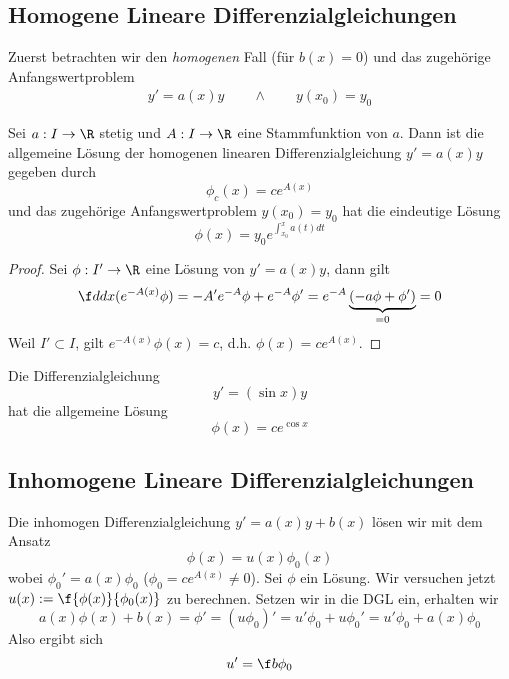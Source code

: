\documentclass{mycourse}
\begin{document}
\subsection{Homogene Lineare Differenzialgleichungen}

Zuerst betrachten wir den \emph{homogenen} Fall (für $b(x) = 0$) und das zugehörige Anfangswertproblem
\begin{align*}
	y' = a(x)y \qquad\land\qquad
y(x_0) = y_0
\end{align*}

\begin{st} \label{11.2}
	Sei $a:I \to \R$ stetig und $A:I\to \R$ eine Stammfunktion von $a$.
	Dann ist die allgemeine Lösung der homogenen linearen Differenzialgleichung $y' = a(x) y$ gegeben durch
	\[
		\phi_c (x) = c e^{A(x)}
	\]
	und das zugehörige Anfangswertproblem $y(x_0) = y_0$ hat die eindeutige Lösung
	\[
		\phi(x) = y_0 e^{\int_{x_0}^xa(t)dt}
	\]
	\begin{proof}
		Sei $\phi: I' \to \R$ eine Lösung von $y' = a(x) y$, dann gilt
		\[
			\f d{dx} (e^{-A(x)}\phi) = -A'e^{-A}\phi + e^{-A}\phi' = e^{-A}\underbrace{(-a\phi + \phi')}_{=0} = 0
		\]
		Weil $I'\subset I$, gilt $e^{-A(x)}\phi(x) = c$, d.h. $\phi(x) = c e^{A(x)}$.
	\end{proof}
\end{st}

\begin{ex*}
	Die Differenzialgleichung
	\[
		y' = (\sin x)y
	\]
	hat die allgemeine Lösung
	\[
		\phi(x) = ce^{\cos x}
	\]
\end{ex*}

\subsection{Inhomogene Lineare Differenzialgleichungen}

Die inhomogen Differenzialgleichung $y' = a(x)y + b(x)$ lösen wir mit dem Ansatz
\[
	\phi(x) = u(x) \phi_0(x)
\]
wobei $\phi_0' = a(x) \phi_0$ ($\phi_0 = c e^{A(x)}\neq 0$).
Sei $\phi$ ein Lösung.
Wir versuchen jetzt $u(x) := \f {\phi(x)}{\phi_0(x)}$ zu berechnen.
Setzen wir in die DGL ein, erhalten wir
\[
	a(x)\phi(x) + b(x) = \phi' = (u\phi_0)' = u'\phi_0 + u\phi_0' = u'\phi_0 + a(x)\phi_0
\]
Also ergibt sich
\[
	u' = \f b{\phi_0}
\]
\end{document}
